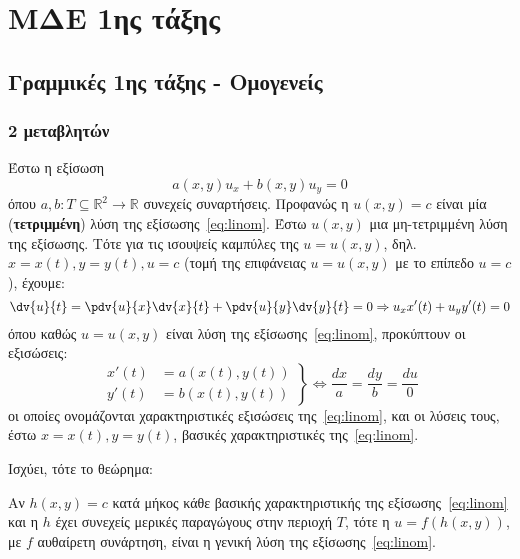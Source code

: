 



\geometry{top=1cm}

\pagestyle{vangelis}
\everymath{\displaystyle}
\setcounter{chapter}{1}



\chapter*{ΜΔΕ 1ης τάξης}

\section*{Γραμμικές 1ης τάξης - Ομογενείς}

\subsection*{2 μεταβλητών}

Έστω η εξίσωση
\begin{equation} \label{eq:linom}
  \boxed{a(x,y)u_{x} + b(x,y)u_{y} = 0}
\end{equation} 
όπου $ a,b \colon T \subseteq \mathbb{R}^{2} \to \mathbb{R}$ συνεχείς συναρτήσεις. 
Προφανώς η $ u(x,y) = c $ είναι μία (\textbf{τετριμμένη}) λύση της 
εξίσωσης~\eqref{eq:linom}. Έστω $ u(x,y) $ μια \textcolor{Col1}{μη-τετριμμένη} λύση της 
εξίσωσης. Τότε για τις ισουψείς καμπύλες της $ u=u(x,y) $, δηλ.  $ x=x(t), y=y(t), u=c $
(τομή της επιφάνειας $ u=u(x,y) $ με το επίπεδο $ u=c $), έχουμε:
\begin{equation*}
  \dv{u}{t} = \pdv{u}{x} \dv{x}{t} + \pdv{u}{y} \dv{y}{t} = 0 \Rightarrow u_{x}x'(t) +
  u_{y} y'(t) = 0
\end{equation*}
όπου καθώς $ u=u(x,y) $ είναι λύση της εξίσωσης~\eqref{eq:linom}, προκύπτουν οι
εξισώσεις:
\[
  \left.
    \begin{aligned}
      x'(t)&=a(x(t),y(t)) \\
      y'(t)&=b(x(t),y(t)) 
    \end{aligned} 
  \right\} \Leftrightarrow \frac{dx}{a} = \frac{dy}{b} = \frac{du}{0}
\]
οι οποίες ονομάζονται \textcolor{Col1}{χαρακτηριστικές εξισώσεις} 
της~\eqref{eq:linom}, και οι λύσεις τους, έστω $ x=x(t), y = y(t) $, 
\textcolor{Col1}{βασικές χαρακτηριστικές} της~\eqref{eq:linom}.

Ισχύει, τότε το θεώρημα:
\begin{mybox2}
  \begin{thm}\label{thm:mde1}
  Αν $ h(x,y)=c $ κατά μήκος κάθε βασικής χαρακτηριστικής της εξίσωσης~\eqref{eq:linom} 
  και η $h$ έχει συνεχείς μερικές παραγώγους στην περιοχή $T$, τότε η $ u=f(h(x,y)) $, 
  με $f$ αυθαίρετη συνάρτηση, είναι η γενική λύση της εξίσωσης~\eqref{eq:linom}.
\end{thm}
\end{mybox2}


